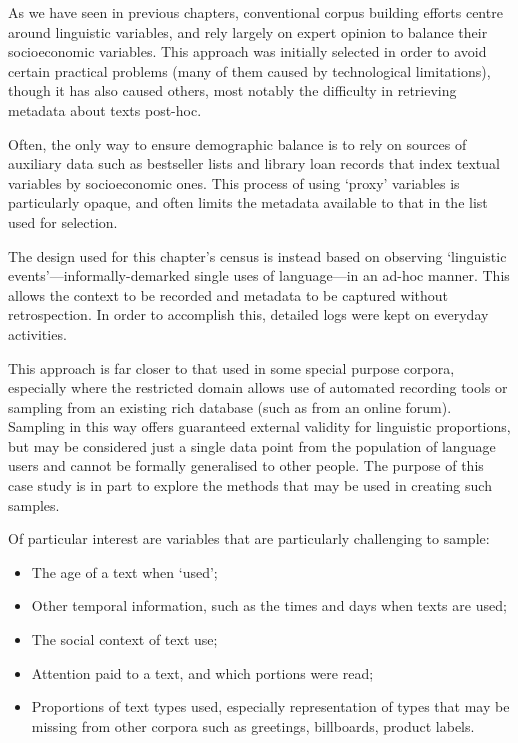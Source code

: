 As we have seen in previous chapters, conventional corpus building efforts centre around linguistic variables, and rely largely on expert opinion to balance their socioeconomic variables.  This approach was initially selected in order to avoid certain practical problems (many of them caused by technological limitations), though it has also caused others, most notably the difficulty in retrieving metadata about texts post-hoc.

Often, the only way to ensure demographic balance is to rely on sources of auxiliary data such as bestseller lists and library loan records that index textual variables by socioeconomic ones.  This process of using `proxy' variables is particularly opaque, and often limits the metadata available to that in the list used for selection.

The design used for this chapter's census is instead based on observing `linguistic events'---informally-demarked single uses of language---in an ad-hoc manner.  This allows the context to be recorded and metadata to be captured without retrospection.  In order to accomplish this, detailed logs were kept on everyday activities.

This approach is far closer to that used in some special purpose corpora, especially where the restricted domain allows use of automated recording tools or sampling from an existing rich database (such as from an online forum).  Sampling in this way offers guaranteed external validity for linguistic proportions, but may be considered just a single data point from the population of language users and cannot be formally generalised to other people.  The purpose of this case study is in part to explore the methods that may be used in creating such samples.

Of particular interest are variables that are particularly challenging to sample:

\begin{itemize}
    \item The age of a text when `used';
    \item Other temporal information, such as the times and days when texts are used;
    \item The social context of text use;
    \item Attention paid to a text, and which portions were read;
    \item Proportions of text types used, especially representation of types that may be missing from other corpora such as greetings, billboards, product labels.
\end{itemize}

